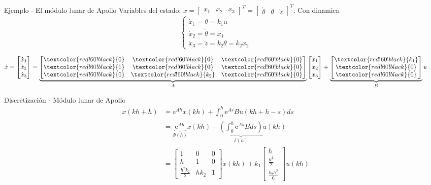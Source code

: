 \documentclass[presentation,aspectratio=1610]{beamer}
\begin{document}
\begin{frame}[label={sec:org8af05d3}]{Ejemplo - El módulo lunar de Apollo}
Variables del estado: \(x = \begin{bmatrix} x_1 & x_2 & x_3 \end{bmatrix}^T = \begin{bmatrix} \dot{\theta} & \theta & \dot{z} \end{bmatrix}^T\). Con dinamica
\[ \begin{cases} \dot{x}_1 =  \ddot{\theta} = k_1 u\\ \dot{x}_2 = \dot{\theta} = x_1\\ \dot{x}_3 = \ddot{z} = k_2\theta = k_2x_2 \end{cases} \]

\[ \dot{x} = \begin{bmatrix} \dot{x}_1\\\dot{x}_2\\\dot{x}_3\end{bmatrix} = \underbrace{\begin{bmatrix} \textcolor{red!60!black}{0} & \textcolor{red!60!black}{0} &\textcolor{red!60!black}{0} \\\textcolor{red!60!black}{1} & \textcolor{red!60!black}{0}& \textcolor{red!60!black}{0}\\ \textcolor{red!60!black}{0}& \textcolor{red!60!black}{k_2} &\textcolor{red!60!black}{0} \end{bmatrix}}_{A} \begin{bmatrix} x_1\\x_2\\x_3\end{bmatrix} + \underbrace{\begin{bmatrix} \textcolor{red!60!black}{k_1} \\ \textcolor{red!60!black}{0} \\\textcolor{red!60!black}{0}  \end{bmatrix}}_{B} u \]
\end{frame}

\begin{frame}[label={sec:orgdc23af2}]{Discretización - Módulo lunar de Apollo}
 \begin{align*}
  x(kh+h) &= \mathrm{e}^{Ah} x(kh) + \int_{0}^{h} \mathrm{e}^{As} B u(kh+h-s) ds\\
   &= \underbrace{\mathrm{e}^{Ah}}_{\Phi(h)} x(kh) + \underbrace{\left(\int_{0}^h \mathrm{e}^{As} B ds \right)}_{\Gamma(h)} u(kh)\\
   &= \begin{bmatrix} 1 & 0 & 0\\h & 1 & 0\\\frac{h^2k_2}{2} & hk_2 & 1\end{bmatrix} x(kh) + k_1 \begin{bmatrix} h\\ \frac{h^2}{2} \\ \frac{k_2 h^3}{6} \end{bmatrix} u(kh)
\end{align*}
\end{frame}
\end{document}
